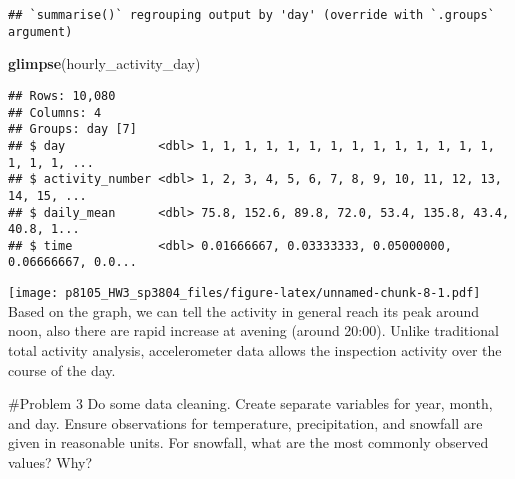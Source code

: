 \documentclass[]{article}
\newenvironment{Shaded}{\begin{snugshade}}{\end{snugshade}}
\newcommand{\DataTypeTok}[1]{\textcolor[rgb]{0.13,0.29,0.53}{#1}}
\newcommand{\KeywordTok}[1]{\textcolor[rgb]{0.13,0.29,0.53}{\textbf{#1}}}
\newcommand{\NormalTok}[1]{#1}
\newcommand{\OperatorTok}[1]{\textcolor[rgb]{0.81,0.36,0.00}{\textbf{#1}}}
\newcommand{\StringTok}[1]{\textcolor[rgb]{0.31,0.60,0.02}{#1}}
\begin{document}
\begin{verbatim}
## `summarise()` regrouping output by 'day' (override with `.groups` argument)
\end{verbatim}

\begin{Shaded}
\begin{Highlighting}[]
\KeywordTok{glimpse}\NormalTok{(hourly_activity_day)}
\end{Highlighting}
\end{Shaded}

\begin{verbatim}
## Rows: 10,080
## Columns: 4
## Groups: day [7]
## $ day             <dbl> 1, 1, 1, 1, 1, 1, 1, 1, 1, 1, 1, 1, 1, 1, 1, 1, 1, ...
## $ activity_number <dbl> 1, 2, 3, 4, 5, 6, 7, 8, 9, 10, 11, 12, 13, 14, 15, ...
## $ daily_mean      <dbl> 75.8, 152.6, 89.8, 72.0, 53.4, 135.8, 43.4, 40.8, 1...
## $ time            <dbl> 0.01666667, 0.03333333, 0.05000000, 0.06666667, 0.0...
\end{verbatim}

\begin{Shaded}
\end{Shaded}

\texttt{[image: p8105\_HW3\_sp3804\_files/figure-latex/unnamed-chunk-8-1.pdf]}
Based on the graph, we can tell the activity in general reach its peak
around noon, also there are rapid increase at avening (around 20:00).
Unlike traditional total activity analysis, accelerometer data allows
the inspection activity over the course of the day.

\#Problem 3 Do some data cleaning. Create separate variables for year,
month, and day. Ensure observations for temperature, precipitation, and
snowfall are given in reasonable units. For snowfall, what are the most
commonly observed values? Why?
\end{document}
